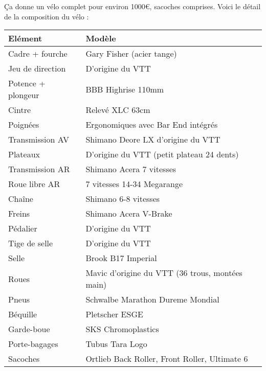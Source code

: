  Ça donne un vélo complet pour environ 1000€, sacoches comprises. Voici le détail de la composition du vélo :
 \begin{center}
  \begin{tabular}{ll}
   \bf  Elément & \bf Modèle    \\ 
   \hline
  Cadre + fourche &  Gary Fisher (acier tange)    \\ 
  Jeu de direction &  D'origine du VTT    \\ 
  Potence + plongeur &  BBB Highrise 110mm    \\ 
  Cintre &  Relevé XLC 63cm    \\  
  Poignées &  Ergonomiques avec Bar End intégrés    \\   
  Transmission AV &  Shimano Deore LX d'origine du VTT    \\   
  Plateaux &  D'origine du VTT (petit plateau 24 dents)    \\   
  Transmission AR &  Shimano Acera 7 vitesses    \\   
  Roue libre AR &  7 vitesses 14-34 Megarange    \\   
  Chaîne &  Shimano 6-8 vitesses    \\   
  Freins &  Shimano Acera V-Brake    \\   
  Pédalier &  D'origine du VTT    \\   
  Tige de selle &  D'origine du VTT    \\   
  Selle &  Brook B17 Imperial    \\   
  Roues &  Mavic d'origine du VTT (36 trous, montées main)    \\   
  Pneus &  Schwalbe Marathon Dureme  Mondial    \\   
  Béquille &  Pletscher ESGE    \\   
  Garde-boue &  SKS Chromoplastics    \\   
  Porte-bagages &  Tubus Tara  Logo    \\   
  Sacoches &  Ortlieb Back Roller, Front Roller, Ultimate 6 \\
  \hline
   \end{tabular}
   \end{center}

